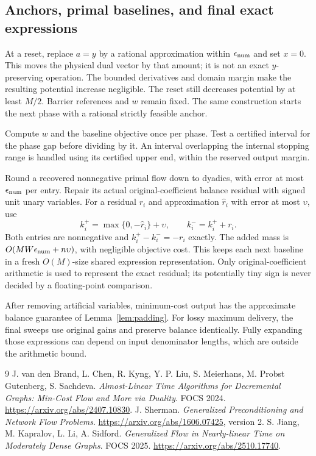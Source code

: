 \documentclass[11pt]{article}
\theoremstyle{definition}\newtheorem{definition}[theorem]{Definition}
\theoremstyle{remark}\newtheorem{remark}[theorem]{Remark}
\begin{document}
\subsection{Anchors, primal baselines, and final exact expressions}

At a reset, replace $a=y$ by a rational approximation within
$\epsilon_{\rm num}$ and set $x=0$. This moves the physical dual
vector by that amount; it is not an exact $y$-preserving operation.
The bounded derivatives and domain margin make the resulting potential
increase negligible. The reset still decreases potential by at least
$M/2$. Barrier references and $w$ remain fixed. The same construction
starts the next phase with a rational strictly feasible anchor.

Compute $w$ and the baseline objective once per phase. Test a certified
interval for the phase gap before dividing by it. An interval overlapping
the internal stopping range is handled using its certified upper end,
within the reserved output margin.

Round a recovered nonnegative primal flow down to dyadics, with error
at most $\epsilon_{\rm num}$ per entry. Repair its actual
original-coefficient balance residual with signed unit unary variables.
For a residual $r_i$ and approximation $\widehat r_i$ with error at most
$\upsilon$, use
\[
 k_i^+=\max\{0,-\widehat r_i\}+\upsilon,\qquad
 k_i^-=k_i^++r_i.
\]
Both entries are nonnegative and $k_i^+-k_i^-=-r_i$ exactly.
The added mass is $O(MW\epsilon_{\rm num}+n\upsilon)$, with negligible
objective cost. This keeps each next baseline in a fresh $O(M)$-size
shared expression representation. Only original-coefficient arithmetic
is used to represent the exact residual; its potentially tiny sign is
never decided by a floating-point comparison.

After removing artificial variables, minimum-cost output has the
approximate balance guarantee of Lemma~\ref{lem:padding}. For lossy
maximum delivery, the final sweeps use original gains and preserve
balance identically. Fully expanding those expressions can depend on
input denominator lengths, which are outside the arithmetic bound.


\begingroup\small
\begin{thebibliography}{9}\setlength{\itemsep}{3pt}
 J. van den Brand, L. Chen, R. Kyng, Y. P. Liu,
S. Meierhans, M. Probst Gutenberg, S. Sachdeva.
\emph{Almost-Linear Time Algorithms for Decremental Graphs:
Min-Cost Flow and More via Duality}. FOCS 2024.
\url{https://arxiv.org/abs/2407.10830}.
 J. Sherman.
\emph{Generalized Preconditioning and Network Flow Problems}.
\url{https://arxiv.org/abs/1606.07425}, version 2.
 S. Jiang, M. Kapralov, L. Li, A. Sidford.
\emph{Generalized Flow in Nearly-linear Time on Moderately Dense Graphs}.
FOCS 2025. \url{https://arxiv.org/abs/2510.17740}.
\end{thebibliography}
\endgroup
\end{document}
